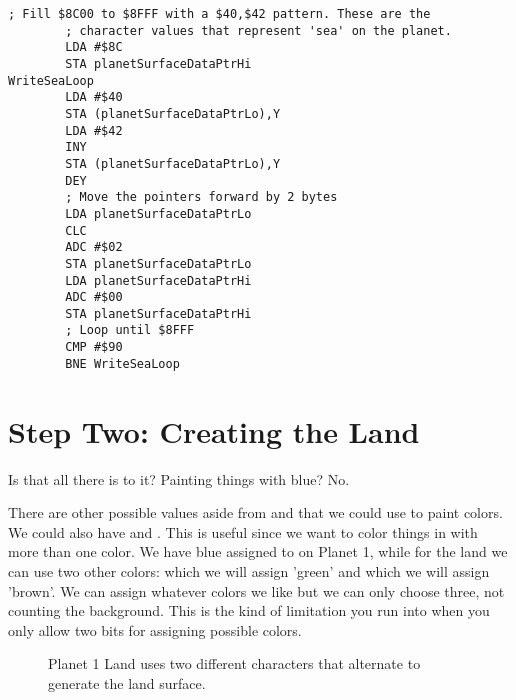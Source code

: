 \begin{lstlisting}[caption=Filling the entire bottom surface of the planet with \icode{\$40,\$42}\, which gives us the sea. Our next step is
to overwrite some of this with land.]
        ; Fill $8C00 to $8FFF with a $40,$42 pattern. These are the
        ; character values that represent 'sea' on the planet.
        LDA #$8C
        STA planetSurfaceDataPtrHi
WriteSeaLoop   
        LDA #$40
        STA (planetSurfaceDataPtrLo),Y
        LDA #$42
        INY
        STA (planetSurfaceDataPtrLo),Y
        DEY
        ; Move the pointers forward by 2 bytes
        LDA planetSurfaceDataPtrLo
        CLC
        ADC #$02
        STA planetSurfaceDataPtrLo
        LDA planetSurfaceDataPtrHi
        ADC #$00
        STA planetSurfaceDataPtrHi
        ; Loop until $8FFF
        CMP #$90
        BNE WriteSeaLoop
\end{lstlisting}



\section{Step Two: Creating the Land}

Is that all there is to it? Painting things with blue? No. 

There are other possible values aside from  and  that we
could use to paint colors. We could also have  and . This
is useful since we want to color things in with more than one color. We have
blue assigned to  on Planet 1, while for the land we can use two
other colors:  which we will assign 'green' and  which we
will assign 'brown'. We can assign whatever colors we like but we can only
choose three, not counting the background. This is the kind of limitation you
run into when you only allow two bits for assigning possible colors.

\begin{figure}[H]
{
  \setlength{\tabcolsep}{3.0pt}
  \setlength\cmidrulewidth{\heavyrulewidth} %
    \begin{adjustbox}{width=10cm,center}
  \begin{subfigure}{0.3\textwidth}
  
  \end{subfigure}
  \begin{subfigure}{0.3\textwidth}
  
  \end{subfigure}
  \end{adjustbox}
}\caption[]{Planet 1 Land uses two different characters that alternate to generate the land surface.}
\end{figure}


